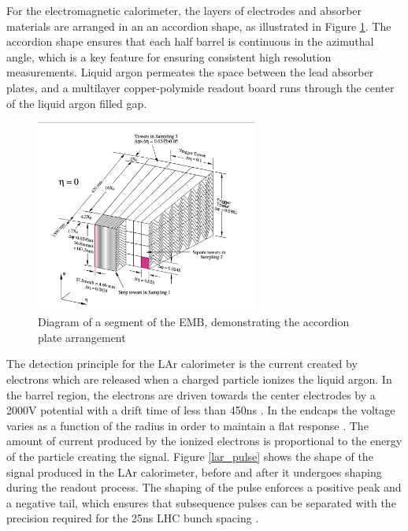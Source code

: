 For the electromagnetic calorimeter, the layers of electrodes and absorber materials are arranged in an an accordion shape, as illustrated in Figure \ref{fig:lar_accordion}. The accordion shape ensures that each half barrel is continuous in the azimuthal angle, which is a key feature for ensuring consistent high resolution measurements. Liquid argon permeates the space between the lead absorber plates, and a multilayer copper-polymide readout board runs through the center of the liquid argon filled gap. \\

\begin{figure}
        \centering
	\includegraphics[width=0.65\textwidth]{figures/ch3/lar_accordion.png}
	\caption{Diagram of a segment of the EMB, demonstrating the accordion plate arrangement \cite{lar_tdr}}
	\label{fig:lar_accordion}
\end{figure}

The detection principle for the LAr calorimeter is the current created by electrons which are released when a charged particle ionizes the liquid argon. In the barrel region, the electrons are driven towards the center electrodes by a 2000V potential with a drift time of less than 450ns \cite{lar_overview}. In the endcaps the voltage varies as a function of the radius in order to maintain a flat response \cite{lar_tdr}. The amount of current produced by the ionized electrons is proportional to the energy of the particle creating the signal. Figure \ref{lar_pulse} shows the shape of the signal produced in the LAr calorimeter, before and after it undergoes shaping during the readout process. The shaping of the pulse enforces a positive peak and a negative tail, which ensures that subsequence pulses can be separated with the precision required for the 25ns LHC bunch spacing \cite{lar_tdr}. \\

